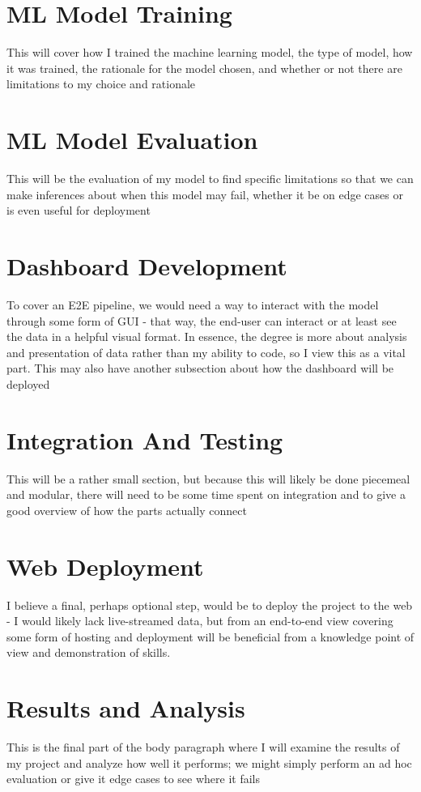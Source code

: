 \documentclass[runningheads]{llncs}
\begin{document}
\section{ML Model Training}
This will cover how I trained the machine learning model, the type of model, how it was trained, the rationale for the model chosen, and whether or not there are limitations to my choice and rationale

\section{ML Model Evaluation}
This will be the evaluation of my model to find specific limitations so that we can make inferences about when this model may fail, whether it be on edge cases or is even useful for deployment

\section{Dashboard Development}
To cover an E2E pipeline, we would need a way to interact with the model through some form of GUI - that way, the end-user can interact or at least see the data in a helpful visual format. In essence, the degree is more about analysis and presentation of data rather than my ability to code, so I view this as a vital part. This may also have another subsection about how the dashboard will be deployed

\section{Integration And Testing}
This will be a rather small section, but because this will likely be done piecemeal and modular, there will need to be some time spent on integration and to give a good overview of how the parts actually connect

\section{Web Deployment}
I believe a final, perhaps optional step, would be to deploy the project to the web - I would likely lack live-streamed data, but from an end-to-end view covering some form of hosting and deployment will be beneficial from a knowledge point of view and demonstration of skills.

\section{Results and Analysis}
This is the final part of the body paragraph where I will examine the results of my project and analyze how well it performs; we might simply perform an ad hoc evaluation or give it edge cases to see where it fails
\end{document}
